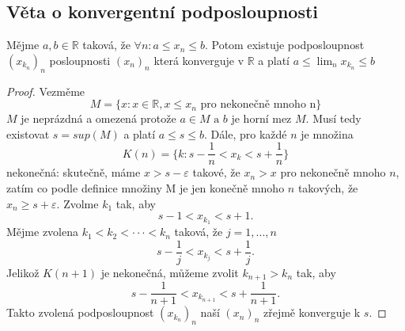 \documentclass[../main.tex]{subfiles}
\begin{document}
\subsection{Věta o konvergentní podposloupnosti}
\begin{theorem}
	Mějme $a,b \in \mathbb{R}$ taková, že $\forall n: a \leq x_n \leq b$. Potom existuje podposloupnost
	$(x_{k_n})_n$ posloupnosti $(x_n)_n$ která konverguje v $\mathbb{R}$ a platí
	$a \leq \lim_n x_{k_n} \leq b$
\end{theorem}

\begin{proof}
	Vezměme \[M = \{x : x \in \mathbb{R}, x \leq x_n \text{ pro nekonečně mnoho n}\}\]
	$M$ je neprázdná a omezená protože $a \in M \text{ a } b$ je horní mez $M$. Musí tedy existovat $s = sup(M)$ a platí 
	$a \leq s \leq b$. Dále, pro každé $n$ je množina 
	\[K(n) = \{k : s - \frac{1}{n} < x_k < s + \frac{1}{n}\}\]
	nekonečná: skutečně, máme $x > s - \varepsilon$ takové, že $x_n > x$ pro nekonečně mnoho $n$, zatím co podle definice množiny M je jen
	konečně mnoho $n$ takových, že $x_n \geq s + \varepsilon$. 
	Zvolme $k_1$ tak, aby
	\[s - 1 < x_{k_{1}} < s+1.\]
	Mějme zvolena $k_1 < k_2 < \cdot \cdot \cdot < k_n$ taková, že $j = 1,...,n$
	\[s - \frac{1}{j} < x_{k_j} < s + \frac{1}{j}.\]
	Jelikož $K(n+1)$ je nekonečná, můžeme zvolit $k_{n+1} > k_n$ tak, aby
	\[s - \frac{1}{n+1} < x_{k_{n+1}} < s + \frac{1}{n+1}.\]
	Takto zvolená podposloupnost $(x_{k_n})_n$ naší $(x_n)_n$ zřejmě konverguje k $s$.
\end{proof}
\end{document}
